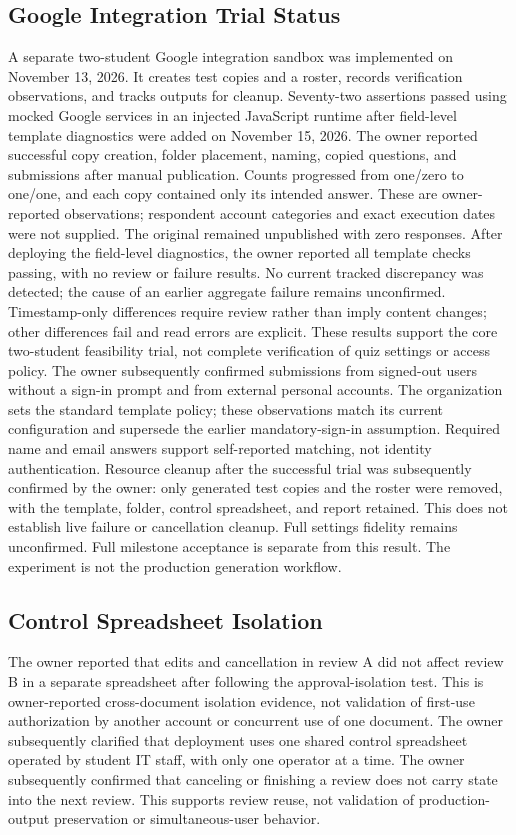 \subsection{Google Integration Trial Status}
A separate two-student Google integration sandbox was implemented on November
13, 2026. It creates test copies and a roster, records verification observations,
and tracks outputs for cleanup. Seventy-two assertions passed using mocked
Google services in an injected JavaScript runtime after field-level template
diagnostics were added on November 15, 2026. The owner reported successful
copy creation, folder placement, naming, copied questions, and submissions after
manual publication. Counts progressed from one/zero to one/one, and each copy
contained only its intended answer. These are owner-reported observations;
respondent account categories and exact execution dates were not supplied.
The original remained unpublished with zero responses. After deploying the
field-level diagnostics, the owner reported all template checks passing, with
no review or failure results. No current tracked discrepancy was detected;
the cause of an earlier aggregate failure remains unconfirmed. Timestamp-only
differences require review rather than imply content changes; other differences
fail and read errors are explicit. These results support the core two-student
feasibility trial, not complete verification of quiz settings or access policy.
The owner subsequently confirmed submissions from signed-out users without a
sign-in prompt and from external personal accounts. The organization sets the
standard template policy; these observations match its current configuration
and supersede the earlier mandatory-sign-in assumption. Required name and email
answers support self-reported matching, not identity authentication. Resource
cleanup after the successful trial was subsequently confirmed by the owner:
only generated test copies and the roster were removed, with the template,
folder, control spreadsheet, and report retained. This does not establish live
failure or cancellation cleanup. Full settings fidelity remains unconfirmed. Full milestone acceptance
is separate from this result.
The experiment is not the production generation workflow.

\subsection{Control Spreadsheet Isolation}
The owner reported that edits and cancellation in review A did not affect
review B in a separate spreadsheet after following the approval-isolation test.
This is owner-reported cross-document isolation evidence, not validation of
first-use authorization by another account or concurrent use of one document.
The owner subsequently clarified that deployment uses one shared control
spreadsheet operated by student IT staff, with only one operator at a time.
The owner subsequently confirmed that canceling or finishing a review does not
carry state into the next review. This supports review reuse, not validation of
production-output preservation or simultaneous-user behavior.

